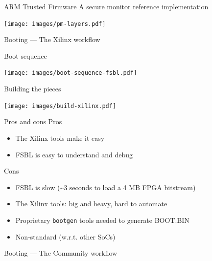 \documentclass[xetex,table]{beamer}
\begin{document}
\begin{frame}{ARM Trusted Firmware}
  A secure monitor reference implementation

   \begin{center}
    \texttt{[image: images/pm-layers.pdf]}
  \end{center}
\end{frame}

\begin{frame}[standout]
   Booting --- The Xilinx workflow
\end{frame}

\begin{frame}{Boot sequence}
  \begin{center}
    \texttt{[image: images/boot-sequence-fsbl.pdf]}
  \end{center}
\end{frame}

\begin{frame}{Building the pieces}
  \begin{center}
    \texttt{[image: images/build-xilinx.pdf]}
  \end{center}
\end{frame}

\begin{frame}{Pros and cons}
    Pros
    \begin{itemize}
    \item The Xilinx tools make it easy
    \item FSBL is easy to understand and debug
    \end{itemize}

    Cons
    \begin{itemize}
    \item FSBL is slow (\textasciitilde{}3 seconds to load a 4 MB FPGA
        bitstream)
    \item The Xilinx tools: big and heavy, hard to automate
    \item Proprietary {\tt bootgen} tools needed to generate BOOT.BIN
    \item Non-standard (w.r.t. other SoCs)
    \end{itemize}
\end{frame}

\begin{frame}[standout]
   Booting --- The Community workflow
\end{frame}
\end{document}
